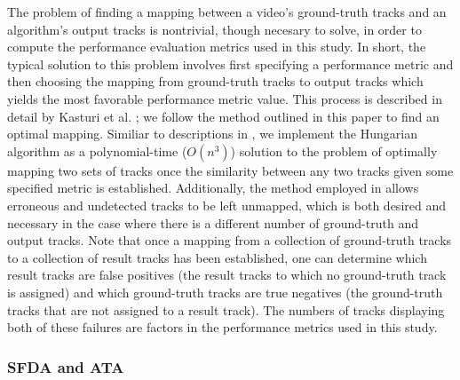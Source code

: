 \documentclass[twocolumn, final]{svjour3}
\begin{document}
The problem of finding a mapping between a video's ground-truth tracks and an algorithm's output tracks is nontrivial, though necesary to solve, in order to compute the performance evaluation metrics used in this study. In short, the typical solution to this problem involves first specifying a performance metric and then choosing the mapping from ground-truth tracks to output tracks which yields the most favorable performance metric value. This process is described in detail by Kasturi et al. \cite{kasturi_2008}; we follow the method outlined in this paper to find an optimal mapping. Similiar to descriptions in \cite{kasturi_2008}, we implement the Hungarian algorithm \cite{munkres_1957} as a polynomial-time ($O(n^{3})$) solution to the problem of optimally mapping two sets of tracks once the similarity between any two tracks given some specified metric is established. Additionally, the method employed in \cite{kasturi_2008} allows erroneous and undetected tracks to be left unmapped, which is both desired and necessary in the case where there is a different number of ground-truth and output tracks. Note that once a mapping from a collection of ground-truth tracks to a collection of result tracks has been established, one can determine which result tracks are false positives (the result tracks to which no ground-truth track is assigned) and which ground-truth tracks are true negatives (the ground-truth tracks that are not assigned to a result track). The numbers of tracks displaying both of these failures are factors in the performance metrics used in this study.


\subsubsection{SFDA and ATA}
\end{document}
